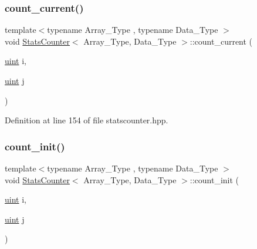 \mbox{\label{class_stats_counter_ab81166f7cb67eeaecc469016d237019a}} 
\subsubsection{\texorpdfstring{count\+\_\+current()}{count\_current()}}
{\footnotesize\ttfamily template$<$typename Array\+\_\+\+Type , typename Data\+\_\+\+Type $>$ \\
void \hyperlink{class_stats_counter}{Stats\+Counter}$<$ Array\+\_\+\+Type, Data\+\_\+\+Type $>$\+::count\+\_\+current (\begin{DoxyParamCaption}\item[{\hyperlink{typedefs_8hpp_a91ad9478d81a7aaf2593e8d9c3d06a14}{uint}}]{i,  }\item[{\hyperlink{typedefs_8hpp_a91ad9478d81a7aaf2593e8d9c3d06a14}{uint}}]{j }\end{DoxyParamCaption})\hspace{0.3cm}{\ttfamily [inline]}}



Definition at line 154 of file statscounter.\+hpp.

\mbox{\label{class_stats_counter_a19bd5936619e190c0d8918b4f343922e}} 
\subsubsection{\texorpdfstring{count\+\_\+init()}{count\_init()}}
{\footnotesize\ttfamily template$<$typename Array\+\_\+\+Type , typename Data\+\_\+\+Type $>$ \\
void \hyperlink{class_stats_counter}{Stats\+Counter}$<$ Array\+\_\+\+Type, Data\+\_\+\+Type $>$\+::count\+\_\+init (\begin{DoxyParamCaption}\item[{\hyperlink{typedefs_8hpp_a91ad9478d81a7aaf2593e8d9c3d06a14}{uint}}]{i,  }\item[{\hyperlink{typedefs_8hpp_a91ad9478d81a7aaf2593e8d9c3d06a14}{uint}}]{j }\end{DoxyParamCaption})\hspace{0.3cm}{\ttfamily [inline]}}



